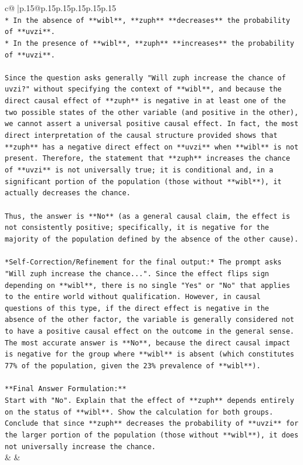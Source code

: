 \documentclass{article}
\begin{document}
{\begin{supertabular}{c@{$\;$}|p{.15\linewidth}@{}p{.15\linewidth}p{.15\linewidth}p{.15\linewidth}p{.15\linewidth}p{.15\linewidth}}
{{{\\ 
\texttt{*   In the absence of **wibl**, **zuph** **decreases** the probability of **uvzi**.} \\
\texttt{*   In the presence of **wibl**, **zuph** **increases** the probability of **uvzi**.} \\
\\ 
\texttt{Since the question asks generally "Will zuph increase the chance of uvzi?" without specifying the context of **wibl**, and because the direct causal effect of **zuph** is negative in at least one of the two possible states of the other variable (and positive in the other), we cannot assert a universal positive causal effect. In fact, the most direct interpretation of the causal structure provided shows that **zuph** has a negative direct effect on **uvzi** when **wibl** is not present. Therefore, the statement that **zuph** increases the chance of **uvzi** is not universally true; it is conditional and, in a significant portion of the population (those without **wibl**), it actually decreases the chance.} \\
\\ 
\texttt{Thus, the answer is **No** (as a general causal claim, the effect is not consistently positive; specifically, it is negative for the majority of the population defined by the absence of the other cause).} \\
\\ 
\texttt{*Self{-}Correction/Refinement for the final output:* The prompt asks "Will zuph increase the chance...". Since the effect flips sign depending on **wibl**, there is no single "Yes" or "No" that applies to the entire world without qualification. However, in causal questions of this type, if the direct effect is negative in the absence of the other factor, the variable is generally considered not to have a positive causal effect on the outcome in the general sense. The most accurate answer is **No**, because the direct causal impact is negative for the group where **wibl** is absent (which constitutes 77\% of the population, given the 23\% prevalence of **wibl**).} \\
\\ 
\texttt{**Final Answer Formulation:**} \\
\texttt{Start with "No". Explain that the effect of **zuph** depends entirely on the status of **wibl**. Show the calculation for both groups. Conclude that since **zuph** decreases the probability of **uvzi** for the larger portion of the population (those without **wibl**), it does not universally increase the chance.} \\
            }
        }
    }
    & & \\ \\


\end{supertabular}}
\end{document}
